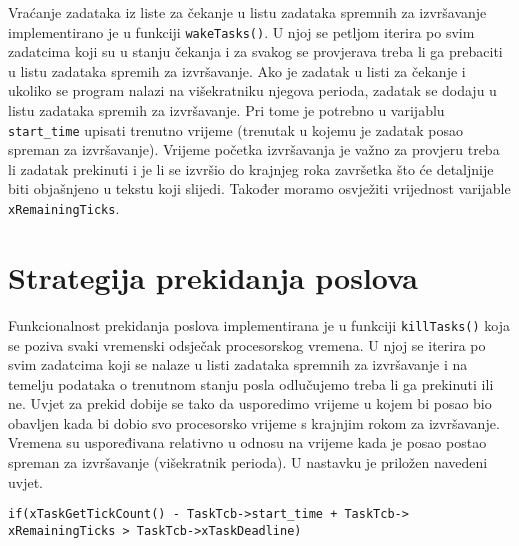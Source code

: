 \documentclass[../zavrsni.tex]{subfiles}
\begin{document}



Vraćanje zadataka iz liste za čekanje u listu zadataka spremnih za izvršavanje implementirano je u funkciji \texttt{wakeTasks()}.
U njoj se petljom iterira po svim zadatcima koji su u stanju čekanja i za svakog se provjerava treba li ga prebaciti u listu zadataka 
spremih za izvršavanje.
Ako je zadatak u listi za čekanje i ukoliko se program nalazi na višekratniku njegova perioda, zadatak se dodaju u listu 
zadataka spremih za izvršavanje. Pri tome je potrebno u varijablu \texttt{start\_time} upisati trenutno vrijeme (trenutak u kojemu je 
zadatak posao spreman za izvršavanje).  
Vrijeme početka izvršavanja je važno za provjeru treba li zadatak prekinuti i je li se izvršio do krajnjeg roka završetka 
što će detaljnije biti objašnjeno u tekstu koji slijedi.
Također moramo osvježiti vrijednost varijable \texttt{xRemainingTicks}.


\section{Strategija prekidanja poslova}

Funkcionalnost prekidanja poslova implementirana je u funkciji \texttt{killTasks()} koja se poziva svaki vremenski 
odsječak procesorskog vremena. U njoj se iterira po svim zadatcima koji se 
nalaze u listi zadataka spremnih za izvršavanje i na temelju podataka o trenutnom stanju posla odlučujemo treba li ga prekinuti ili ne.
Uvjet za prekid dobije se tako da usporedimo vrijeme u kojem bi posao bio obavljen kada bi dobio svo procesorsko vrijeme s krajnjim rokom za izvršavanje. Vremena su uspoređivana
relativno u odnosu na vrijeme kada je posao postao spreman za izvršavanje (višekratnik perioda).
U nastavku je priložen navedeni uvjet.
\begin{lstlisting}[style=CStyle,caption={Uvjet za prekidanje izvođenja posla},captionpos=b]
if(xTaskGetTickCount() - TaskTcb->start_time + TaskTcb->
xRemainingTicks > TaskTcb->xTaskDeadline)
\end{lstlisting}
\end{document}
